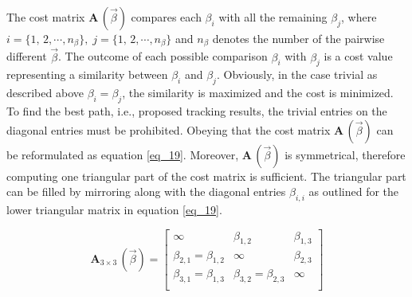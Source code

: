 The cost matrix $\bm A\,(\vec{\beta})$ compares each $\beta_i$ with all the remaining $\beta_j$, where $i = \{1, \,2, \cdots, n_{\beta}\}, \; j = \{1, \,2, \cdots, n_{\beta}\}$ and $ n_{\beta}$ denotes the number of the pairwise different $\vec{\beta}$.
The outcome of each possible comparison $\beta_i$ with $\beta_j$ is a cost value representing a similarity between $\beta_i$ and $\beta_j$. 
Obviously, in the case trivial as described above $\beta_i = \beta_j$, the similarity is maximized and the cost is minimized. 
To find the best path, i.e., proposed tracking results, the trivial entries on the diagonal entries must be prohibited. Obeying that the cost matrix $\bm A\,(\vec{\beta})$ can be reformulated as equation \eqref{eq_19}. 
Moreover, $\bm A\,(\vec{\beta})$ is symmetrical, therefore computing one triangular part of the cost matrix is sufficient. 
The triangular part can be filled by mirroring along with the diagonal entries $\beta_{i,i}$ as outlined for the lower triangular matrix in equation \eqref{eq_19}. 
\newline

\begin{equation}
     \bm A_{3\times 3}\,(\vec{\beta}) = 
     \begin{bmatrix}
       \infty & \beta_{1,2} & \beta_{1,3}\\
       \beta_{2,1} = \beta_{1,2} & \infty & \beta_{2,3}\\
       \beta_{3,1} =  \beta_{1,3} & \beta_{3,2} =\beta_{2,3}  & \infty\\
     \end{bmatrix}
     \label{eq_19}
\end{equation}
